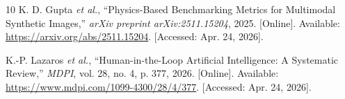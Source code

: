 \documentclass[12pt,a4paper]{article}
\begin{document}
\begin{thebibliography}{10}
K. D. Gupta \textit{et al.}, ``Physics-Based Benchmarking Metrics for Multimodal Synthetic Images,'' \textit{arXiv preprint arXiv:2511.15204}, 2025. [Online]. Available: \url{https://arxiv.org/abs/2511.15204}. [Accessed: Apr. 24, 2026].

K.-P. Lazaros \textit{et al.}, ``Human-in-the-Loop Artificial Intelligence: A Systematic Review,'' \textit{MDPI}, vol. 28, no. 4, p. 377, 2026. [Online]. Available: \url{https://www.mdpi.com/1099-4300/28/4/377}. [Accessed: Apr. 24, 2026].

\end{thebibliography}





\end{document}
